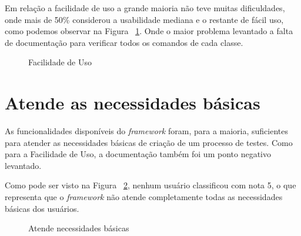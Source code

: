         Em relação a facilidade de uso a grande maioria não teve muitas dificuldades, onde mais de 50\% considerou a usabilidade mediana e o restante de fácil uso,
        como podemos observar na Figura ~\ref{fig:uso}. Onde o maior problema levantado a falta de documentação para verificar todos os comandos de cada classe.

        \begin{figure}[H]
            \vspace*{0,2cm}
            \centering
            \caption{Facilidade de Uso}
            \label{fig:uso}
        \end{figure}

    \section{Atende as necessidades básicas}
        As funcionalidades disponíveis do \textit{framework} foram, para a maioria, suficientes para atender as necessidades básicas de criação de um processo de testes.
        Como para a Facilidade de Uso, a documentação também foi um ponto negativo levantado.

          Como pode ser visto na Figura ~\ref{fig:basico}, nenhum usuário classificou com nota 5, o que representa que o \textit{framework} não atende completamente
          todas as necessidades básicas dos usuários.

        \begin{figure}[H]
            \vspace*{0,2cm}
            \centering
            \caption{Atende necessidades básicas}
            \label{fig:basico}
        \end{figure}

